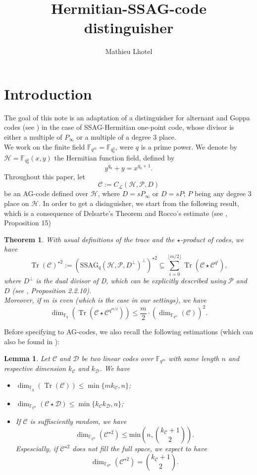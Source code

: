 \documentclass[a4paper]{article}
\title{Hermitian-SSAG-code distinguisher}
\author{Mathieu Lhotel}
\date{}
\newtheorem{thm}{Theorem}
\newtheorem{lem1}{Lemma}
\newcommand{\calP}{\mathcal{P}}
\newcommand{\calH}{\mathcal{H}}
\newcommand{\calL}{\mathcal{L}}
\newcommand{\calC}{\mathcal{C}}
\newcommand{\calD}{\mathcal{D}}
\newcommand{\Tr}{\operatorname{Tr}}
\newcommand{\fqm}{\mathbb{F}_{q^m}}
\begin{document}
\maketitle

\section{Introduction}

The goal of this note is an adaptation of a distinguisher for alternant and Goppa codes (see \cite{rocco}) in the case of SSAG-Hermitian one-point code, whose divisor is either a multiple of $P_{\infty}$ or a multiple of a degree 3 place. \\
We work on the finite field $\mathbb{F}_{q^m}=\mathbb{F}_{q_0^2}$, were $q$ is a prime power. We denote by $\calH = \mathbb{F}_{q_0^2}(x,y)$ the Hermitian function field, defined by 
\[ y^{q_0}+y=x^{q_0+1}.\]
Throughout this paper, let
\[\mathcal{C} := C_{\calL}(\calH,\mathcal{P},D) \]
be an AG-code defined over $\calH$, where $D=sP_{\infty}$ or $D=sP$; $P$ being any degree 3 place on $\calH$. 
In order to get a disinguisher, we start from the following result, which is a consequence of Delsarte's Theorem and Rocco's estimate (see \cite{rocco}, Proposition 15)

\begin{thm} \label{th1}
With usual definitions of the trace and the $\star$-product of codes, we have 
\[ \Tr(\mathcal{C})^{\star2} := (\mathrm{SSAG}_{q}(\calH,\calP,D^{\perp})^{\perp})^{\star2} \subseteq \sum\limits_{i=0}^{\lfloor{m/2} \rfloor} \Tr(\mathcal{C}\star\mathcal{C}^{q^i}),\]
where $D^{\perp}$ is the dual divisor of D, which can be explicitly described using $\calP$ and $D$ (see \cite{sti}, Proposition 2.2.10). \\
Moreover, if $m$ is even (which is the case in our settings), we have 
\[\dim_{\mathbb{F}_q}(\Tr(\calC \star \calC^{q^{m/2}})) \leq \frac{m}{2}\cdot (\dim_{\fqm}(\calC))^2.\]
\end{thm}

Before specifying to AG-codes, we also recall the following estimations (which can also be found in \cite{rocco}):

\begin{lem1} \label{known_bounds}
Let $\calC$ and $\calD$ be two linear codes over $\fqm$ with same length $n$ and respective dimension $k_{\calC}$ and $k_{\calD}$. We have
\begin{itemize}
    \item[$(1)$] $\dim_{\mathbb{F}_q}(\Tr(\calC)) \leq \min\{mk_{\calC},n\}$;
    \item[$(2)$] $\dim_{\fqm}(\calC \star \calD) \leq \min\{k_{\calC}k_{\calD},n\}$;
    \item[$(3)$] If $\calC$ is suffisciently random, we have
     \[ \dim_{\mathbb{F}_{q^m}}(\calC^{\star2}) \leq \mathrm{min}\left(n,\binom{k_{\calC}+1}{2}\right) . \]
     Espescially, if $\calC^{\star2}$ does not fill the full space, we expect to have 
     \[ \dim_{\mathbb{F}_{q^m}}(\calC^{\star2}) = \binom{k_{\calC}+1}{2}.\]
\end{itemize}
\end{lem1}
\end{document}

